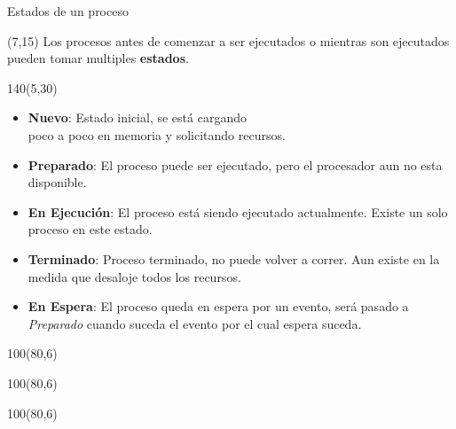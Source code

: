 \documentclass[aspectratio=169]{beamer}
\begin{document}
\begin{frame}[fragile]{Estados de un proceso}
    \begin{textblock}{55}(7,15)
    \small
    Los procesos antes de comenzar a ser ejecutados o mientras son ejecutados pueden tomar multiples \textbf{estados}.\\
    \end{textblock}
    \begin{textblock}{140}(5,30)
    \small
    \begin{itemize}
    \setlength\itemsep{0cm}
    \item<2->[-] \textbf{Nuevo}: Estado inicial, se está cargando\\ poco a poco en memoria y solicitando recursos.
    \item<3->[-] \textbf{Preparado}: El proceso puede ser ejecutado, pero el procesador aun no esta disponible.
    \item<4->[-] \textbf{En Ejecución}: El proceso está siendo ejecutado actualmente. Existe un solo proceso en este estado.
    \item<5->[-] \textbf{Terminado}: Proceso terminado, no puede volver a correr. Aun existe en la medida que desaloje todos los recursos.
    \end{itemize}
    \begin{itemize}
    \setlength\itemsep{0cm}
    \item<7-> \textbf{En Espera}: El proceso queda en espera por un evento, será pasado a \emph{Preparado} cuando suceda el evento por el cual espera suceda.
    \end{itemize}
    \begin{center}
    \end{center}
    \end{textblock}
    \begin{textblock}{100}(80,6)  \end{textblock} %
    \begin{textblock}{100}(80,6)  \end{textblock} %
    \begin{textblock}{100}(80,6)  \end{textblock} %

\end{frame}
\end{document}
